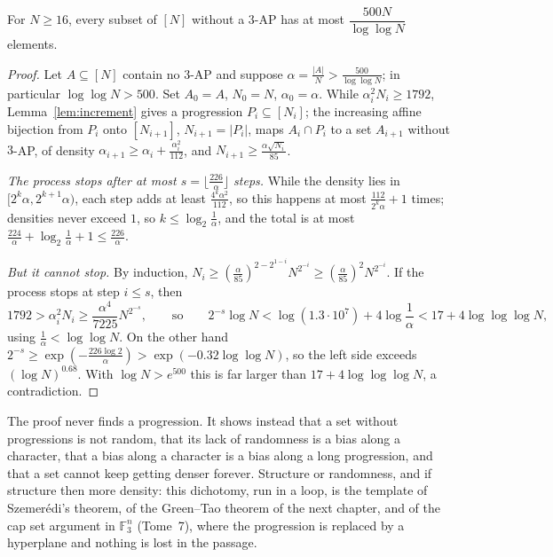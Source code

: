 \begin{theorem}[Roth, 1953]\label{thm:roth}
For $N\ge16$, every subset of $[N]$ without a $3$-AP has at most $\dfrac{500N}{\log\log N}$ elements.
\end{theorem}
\begin{proof}
Let $A\subseteq[N]$ contain no $3$-AP and suppose $\alpha=\frac{|A|}N>\frac{500}{\log\log N}$; in particular $\log\log N>500$. Set $A_0=A$, $N_0=N$, $\alpha_0=\alpha$. While $\alpha_i^2N_i\ge1792$, Lemma~\ref{lem:increment} gives a progression $P_i\subseteq[N_i]$; the increasing affine bijection from $P_i$ onto $[N_{i+1}]$, $N_{i+1}=|P_i|$, maps $A_i\cap P_i$ to a set $A_{i+1}$ without $3$-AP, of density $\alpha_{i+1}\ge\alpha_i+\frac{\alpha_i^2}{112}$, and $N_{i+1}\ge\frac{\alpha\sqrt{N_i}}{85}$.

\emph{The process stops after at most $s=\lfloor\frac{226}\alpha\rfloor$ steps.} While the density lies in $[2^k\alpha,2^{k+1}\alpha)$, each step adds at least $\frac{4^k\alpha^2}{112}$, so this happens at most $\frac{112}{2^k\alpha}+1$ times; densities never exceed $1$, so $k\le\log_2\frac1\alpha$, and the total is at most $\frac{224}\alpha+\log_2\frac1\alpha+1\le\frac{226}\alpha$.

\emph{But it cannot stop.} By induction, $N_i\ge(\frac\alpha{85})^{2-2^{1-i}}N^{2^{-i}}\ge(\frac\alpha{85})^2N^{2^{-i}}$. If the process stops at step $i\le s$, then
\[
1792>\alpha_i^2N_i\ge\frac{\alpha^4}{7225}N^{2^{-s}},\qquad\text{so}\qquad2^{-s}\log N<\log(1.3\cdot10^7)+4\log\frac1\alpha<17+4\log\log\log N,
\]
using $\frac1\alpha<\log\log N$. On the other hand $2^{-s}\ge\exp(-\frac{226\log2}\alpha)>\exp(-0.32\log\log N)$, so the left side exceeds $(\log N)^{0.68}$. With $\log N>e^{500}$ this is far larger than $17+4\log\log\log N$, a contradiction.
\end{proof}

\begin{beauty}
The proof never finds a progression. It shows instead that a set without progressions is not random, that its lack of randomness is a bias along a character, that a bias along a character is a bias along a long progression, and that a set cannot keep getting denser forever. Structure or randomness, and if structure then more density: this dichotomy, run in a loop, is the template of Szemerédi's theorem, of the Green--Tao theorem of the next chapter, and of the cap set argument in $\mathbb F_3^n$ (Tome~7), where the progression is replaced by a hyperplane and nothing is lost in the passage.
\end{beauty}

